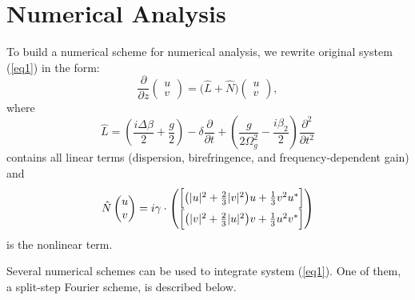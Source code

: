 \documentclass{article}
\begin{document}
\section{Numerical Analysis}
    To build a numerical scheme for numerical analysis, we rewrite original system (\ref{eq1}) in the form:
    \begin{equation}
        \frac{\partial}{\partial z}\begin{pmatrix}u\\v\end{pmatrix}
        = \bigl(\hat L + \hat N\bigr)\begin{pmatrix}u\\v\end{pmatrix},
    \end{equation}
    where
    \begin{equation}
        \hat L =
            \left(\frac{i\Delta\beta}{2}+\frac{g}{2}\right)
            - \delta\frac{\partial}{\partial t}
            + \left(\frac{g}{2\Omega_{g}^2}-\frac{i\beta_{2}}{2}\right)\frac{\partial^2}{\partial t^2}
    \end{equation}
    contains all linear terms (dispersion, birefringence, and frequency‑dependent gain) and
    \begin{equation}\label{eq44}
        \hat N\begin{pmatrix}u\\v\end{pmatrix} =
            i\gamma \cdot \begin{pmatrix}
            \Bigl[\bigl(|u|^2+\tfrac{2}{3}|v|^2\bigr)u + \tfrac{1}{3}v^2 u^*\Bigr]\\[4pt]
            \Bigl[\bigl(|v|^2+\tfrac{2}{3}|u|^2\bigr)v + \tfrac{1}{3}u^2 v^*\Bigr]
            \end{pmatrix}
    \end{equation}
    is the nonlinear term.

    Several numerical schemes can be used to integrate system (\ref{eq1}). One of them, a split-step Fourier scheme, is described below.
\end{document}
